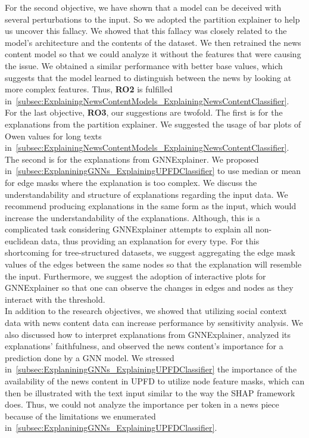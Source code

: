 For the second objective, we have shown that a model can be deceived with several perturbations to the input. So we adopted the partition explainer to help us uncover this fallacy. We showed that this fallacy was closely related to the  model's architecture and the contents of the dataset. We then retrained the news content model so that we could analyze it without the features that were causing the issue. We obtained a similar performance with better base values, which suggests that the model learned to distinguish between the news by looking at more complex features. Thus, \textbf{RO2} is fulfilled in~\ref{subsec:ExplainingNewsContentModels_ExplainingNewsContentClassifier}.\\
For the last objective, \textbf{RO3}, our suggestions are twofold. The first is for the explanations from the partition explainer. We suggested the usage of bar plots of Owen values for long texts in~\ref{subsec:ExplainingNewsContentModels_ExplainingNewsContentClassifier}. The second is for the explanations from GNNExplainer. We proposed in~\ref{subsec:ExplaniningGNNs_ExplainingUPFDClassifier} to use median or mean for edge masks where the explanation is too complex. We discuss the understandability and structure of explanations regarding the input data. We recommend producing explanations in the same form as the input, which would increase the understandability of the explanations. Although, this is a complicated task considering GNNExplainer attempts to explain all non-euclidean data, thus providing an explanation for every type. For this shortcoming for tree-structured datasets, we suggest aggregating the edge mask values of the edges between the same nodes so that the explanation will resemble the input. Furthermore, we suggest the adoption of interactive plots for GNNExplainer so that one can observe the changes in edges and nodes as they interact with the threshold.\\
In addition to the research objectives, we showed that utilizing social context data with news content data can increase performance by sensitivity analysis. We also discussed how to interpret explanations from GNNExplainer, analyzed its explanations' faithfulness, and observed the news content's importance for a prediction done by a GNN model. We stressed in~\ref{subsec:ExplaniningGNNs_ExplainingUPFDClassifier} the importance of the availability of the news content in UPFD to utilize node feature masks, which can then be illustrated with the text input similar to the way the SHAP framework does. Thus, we could not analyze the importance per token in a news piece because of the limitations we enumerated in~\ref{subsec:ExplaniningGNNs_ExplainingUPFDClassifier}.\\
